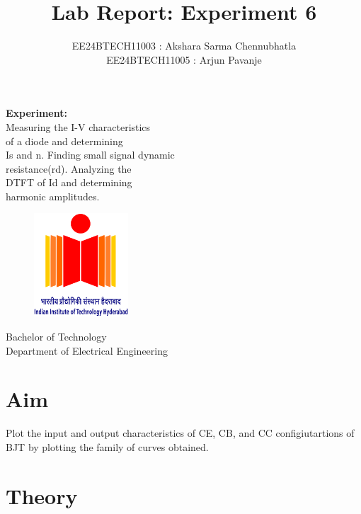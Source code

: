 \documentclass[12pt,a4paper]{article}
\title{\textbf{Lab Report: Experiment 6}}
\author{EE24BTECH11003 : Akshara Sarma Chennubhatla\\EE24BTECH11005 : Arjun Pavanje}
\begin{document}
\maketitle
\begin{center}
	\textbf{Experiment:\\}Measuring the I-V characteristics\\of a diode and determining\\Is and n. Finding small signal dynamic\\resistance(rd). Analyzing the\\DTFT of Id and determining\\harmonic amplitudes.
\end{center}
\vspace{30pt}
\begin{figure}[h!]
	\centering
	\includegraphics[width = 100pt]{logo.png}\\
\end{figure}
\begin{center}
	Bachelor of Technology\\
	\vspace{10pt}
	Department of Electrical Engineering\\
\end{center}
\newpage

\section{Aim}

Plot the input and output characteristics of CE, CB, and CC configiutartions of BJT by plotting the family of curves obtained.

\section{Theory}
\end{document}

